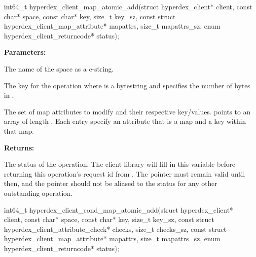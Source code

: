 \funcsep
{}
\begin{ccode}
int64_t hyperdex_client_map_atomic_add(struct hyperdex_client* client,
                const char* space,
                const char* key, size_t key_sz,
                const struct hyperdex_client_map_attribute* mapattrs, size_t mapattrs_sz,
                enum hyperdex_client_returncode* status);
\end{ccode}
\funcdesc 

\noindent\textbf{Parameters:}
\begin{description}[labelindent=\widthof{{\code{mapattrs}, \code{mapattrs\_sz}}},leftmargin=*,noitemsep,nolistsep,align=right]
\item[\code{space}] The name of the space as a c-string.
\item[\code{key}, \code{key\_sz}] The key for the operation where  is a bytestring and  specifies the number of bytes in .
\item[\code{mapattrs}, \code{mapattrs\_sz}] The set of map attributes to modify and their respective key/values.   points to an array of length .  Each entry specify an attribute that is a map and a key within that map.
\end{description}

\noindent\textbf{Returns:}
\begin{description}[labelindent=\widthof{{\code{status}}},leftmargin=*,noitemsep,nolistsep,align=right]
\item[\code{status}] The status of the operation.  The client library will fill in this variable before returning this operation's request id from .  The pointer must remain valid until then, and the pointer should not be aliased to the status for any other outstanding operation.
\end{description}

\funcsep
{}
\begin{ccode}
int64_t hyperdex_client_cond_map_atomic_add(struct hyperdex_client* client,
                const char* space,
                const char* key, size_t key_sz,
                const struct hyperdex_client_attribute_check* checks, size_t checks_sz,
                const struct hyperdex_client_map_attribute* mapattrs, size_t mapattrs_sz,
                enum hyperdex_client_returncode* status);
\end{ccode}
\funcdesc 

